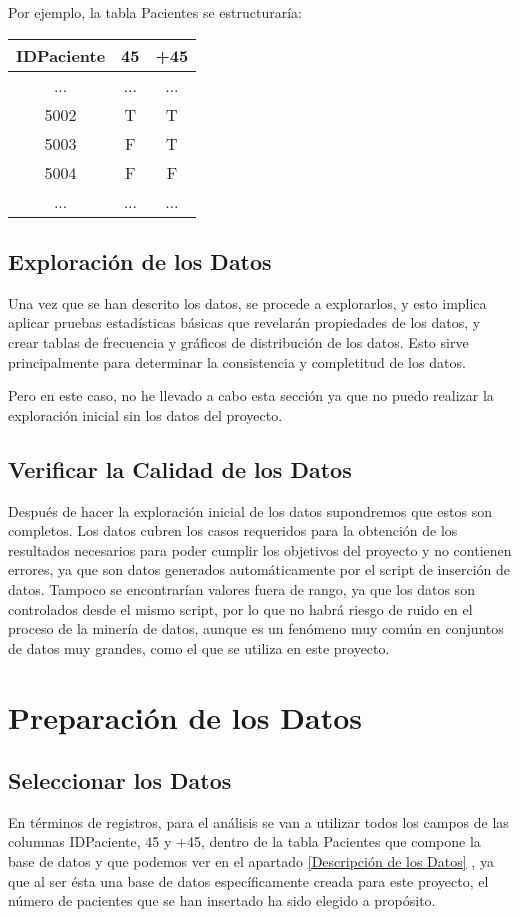 \documentclass{article}
\begin{document}
Por ejemplo, la tabla Pacientes se estructuraría:

\begin{center}
	\begin{tabular}{ |c|c|c| } 
		\hline
		IDPaciente & 45 & +45 \\
		\hline
		... & ... & ... \\ 
		5002 & T & T\\ 
		5003 & F & T\\ 
		5004 & F & F\\
		... & ... & ... \\ 
		\hline
\end{tabular}
\end{center}

\subsection{Exploración de los Datos}
Una vez que se han descrito los datos, se procede a explorarlos, y esto implica aplicar pruebas estadísticas básicas que revelarán propiedades de los datos, y crear tablas de frecuencia y gráficos de distribución de los datos. Esto sirve principalmente para determinar la consistencia y completitud de los datos.

Pero en este caso, no he llevado a cabo esta sección ya que no puedo realizar la exploración inicial sin los datos del proyecto.

\subsection{Verificar la Calidad de los Datos}
Después de hacer la exploración inicial de los datos supondremos que estos son completos. Los datos cubren los casos requeridos para la obtención de los resultados necesarios para poder cumplir los objetivos del proyecto y no contienen errores, ya que son datos generados automáticamente por el script de inserción de datos. Tampoco se encontrarían valores fuera de rango, ya que los datos son controlados desde el mismo script, por lo que no habrá riesgo de ruido en el proceso de la minería de datos, aunque es un fenómeno muy común en conjuntos de datos muy grandes, como el que se utiliza en este proyecto.

\section{Preparación de los Datos}

\subsection{Seleccionar los Datos}
En términos de registros, para el análisis se van a utilizar todos los campos de las columnas IDPaciente, 45 y +45, dentro de la tabla Pacientes que compone la base de datos y que podemos ver en el apartado \ref{Descripción de los Datos} , ya que al ser ésta una base de datos específicamente creada para este proyecto, el número de pacientes que se han insertado ha sido elegido a propósito. 
\end{document}
